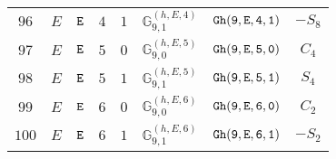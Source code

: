 \documentclass[fleqn,8pt]{jsarticle}
\begin{document}
\begin{table}[ht!]
\begin{center}
\begin{tabular}{cccccccc}
$ 96 $ & $ E $ & $ {\tt E} $ & $ 4 $ & $ 1 $ & $ \mathbb{G}_{9,1}^{(h,E,4)} $ & $ {\tt Gh(9,E,4,1)} $ & $ - S_{8} $ \\
$ 97 $ & $ E $ & $ {\tt E} $ & $ 5 $ & $ 0 $ & $ \mathbb{G}_{9,0}^{(h,E,5)} $ & $ {\tt Gh(9,E,5,0)} $ & $ C_{4} $ \\
$ 98 $ & $ E $ & $ {\tt E} $ & $ 5 $ & $ 1 $ & $ \mathbb{G}_{9,1}^{(h,E,5)} $ & $ {\tt Gh(9,E,5,1)} $ & $ S_{4} $ \\
$ 99 $ & $ E $ & $ {\tt E} $ & $ 6 $ & $ 0 $ & $ \mathbb{G}_{9,0}^{(h,E,6)} $ & $ {\tt Gh(9,E,6,0)} $ & $ C_{2} $ \\
$ 100 $ & $ E $ & $ {\tt E} $ & $ 6 $ & $ 1 $ & $ \mathbb{G}_{9,1}^{(h,E,6)} $ & $ {\tt Gh(9,E,6,1)} $ & $ - S_{2} $ \\
 \hline \hline
\end{tabular}
\end{center}
\end{table}
\end{document}
